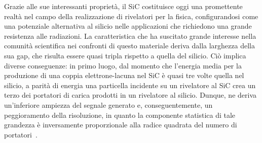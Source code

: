 Grazie alle sue interessanti proprietà, il SiC costituisce oggi una promettente realtà nel campo della realizzazione di rivelatori per la fisica, configurandosi come una potenziale alternativa al silicio nelle applicazioni che richiedono una grande resistenza alle radiazioni.
%
La caratteristica che ha suscitato grande interesse nella comunità scientifica nei confronti di questo materiale deriva dalla larghezza della sua gap, che risulta essere quasi tripla rispetto a quella del silicio.
Ciò implica diverse conseguenze: in primo luogo, dal momento che l'energia media per la produzione di una coppia elettrone-lacuna nel SiC è quasi tre volte quella nel silicio, a parità di energia una particella incidente su un rivelatore al SiC crea un terzo dei portatori di carica prodotti in un rivelatore al silicio.
Dunque, ne deriva un'inferiore ampiezza del segnale generato e, conseguentemente, un peggioramento della risoluzione, in quanto la componente statistica di tale grandezza è inversamente proporzionale alla radice quadrata del numero di portatori~\cite{knoll:10}.
%
